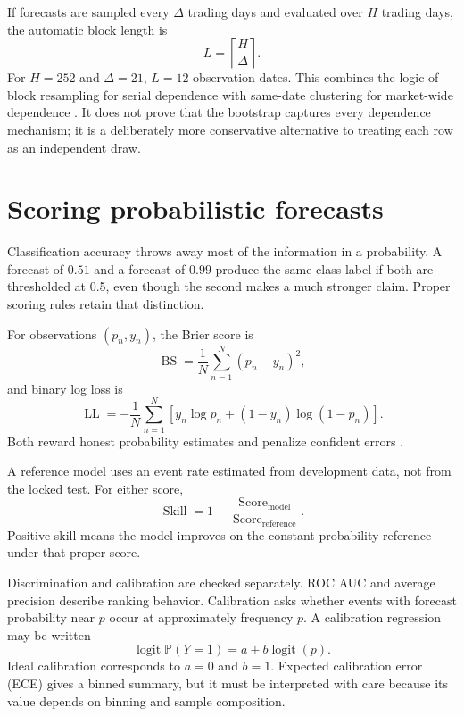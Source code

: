 \documentclass[11pt]{article}
\newcommand{\logit}{\operatorname{logit}}
\newcommand{\Prb}{\mathbb{P}}
\begin{document}
If forecasts are sampled every $\Delta$ trading days and evaluated over $H$ trading days, the automatic block length is
\begin{equation}
L=\left\lceil\frac{H}{\Delta}\right\rceil.
\label{eq:blocklength}
\end{equation}
For $H=252$ and $\Delta=21$, $L=12$ observation dates. This combines the logic of block resampling for serial dependence with same-date clustering for market-wide dependence \citep{kunsch1989jackknife,politis1994stationary}. It does not prove that the bootstrap captures every dependence mechanism; it is a deliberately more conservative alternative to treating each row as an independent draw.

\section{Scoring probabilistic forecasts}
\label{sec:metrics}

Classification accuracy throws away most of the information in a probability. A forecast of $0.51$ and a forecast of $0.99$ produce the same class label if both are thresholded at 0.5, even though the second makes a much stronger claim. Proper scoring rules retain that distinction.

For observations $(p_n,y_n)$, the Brier score is
\begin{equation}
\operatorname{BS}=\frac1N\sum_{n=1}^{N}(p_n-y_n)^2,
\label{eq:brier}
\end{equation}
and binary log loss is
\begin{equation}
\operatorname{LL}=-\frac1N\sum_{n=1}^{N}
\left[y_n\log p_n+(1-y_n)\log(1-p_n)\right].
\label{eq:logloss}
\end{equation}
Both reward honest probability estimates and penalize confident errors \citep{brier1950verification,gneiting2007proper}.

A reference model uses an event rate estimated from development data, not from the locked test. For either score,
\begin{equation}
\operatorname{Skill}=1-\frac{\operatorname{Score}_{\mathrm{model}}}
{\operatorname{Score}_{\mathrm{reference}}}.
\label{eq:skill}
\end{equation}
Positive skill means the model improves on the constant-probability reference under that proper score.

Discrimination and calibration are checked separately. ROC AUC and average precision describe ranking behavior. Calibration asks whether events with forecast probability near $p$ occur at approximately frequency $p$. A calibration regression may be written
\begin{equation}
\logit\Prb(Y=1)=a+b\logit(p).
\label{eq:calslope}
\end{equation}
Ideal calibration corresponds to $a=0$ and $b=1$. Expected calibration error (ECE) gives a binned summary, but it must be interpreted with care because its value depends on binning and sample composition.
\end{document}
